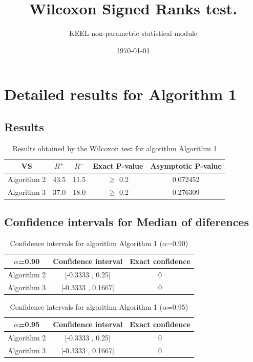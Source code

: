 \documentclass[a4paper,10pt]{article}
\title{Wilcoxon Signed Ranks test.}
\date{\today}
\author{KEEL non-parametric statistical module}
\begin{document}
\pagestyle{empty}
\maketitle
\thispagestyle{empty}



\section{Detailed results for Algorithm 1}


\subsection{Results}

\begin{table}[!htp]
\centering\small
\begin{tabular}{
|c|c|c|c|c|}
\hline
 VS & $R^{+}$ & $R^{-}$ & Exact P-value & Asymptotic P-value \\ \hline 
Algorithm 2 & 43.5 & 11.5 & $\geq$ 0.2 & 0.072452\\ \hline 
Algorithm 3 & 37.0 & 18.0 & $\geq$ 0.2 & 0.276309\\ \hline 

\end{tabular}
\caption{Results obtained by the Wilcoxon test for algorithm Algorithm 1}
\end{table}

\subsection{Confidence intervals for Median of diferences}

\begin{table}[!htp]
\centering\small
\begin{tabular}{
|c|c|c|}
\hline
 $\alpha$=0.90 & Confidence interval & Exact confidence \\ \hline 
Algorithm 2 & [-0.3333 , 0.25] & 0\\ \hline 
Algorithm 3 & [-0.3333 , 0.1667] & 0\\ \hline 

\end{tabular}
\caption{Confidence intervals for algorithm Algorithm 1 ($\alpha$=0.90)}
\end{table}
\begin{table}[!htp]
\centering\small
\begin{tabular}{
|c|c|c|}
\hline
 $\alpha$=0.95 & Confidence interval & Exact confidence \\ \hline 
Algorithm 2 & [-0.3333 , 0.25] & 0\\ \hline 
Algorithm 3 & [-0.3333 , 0.1667] & 0\\ \hline 

\end{tabular}
\caption{Confidence intervals for algorithm Algorithm 1 ($\alpha$=0.95)}
\end{table}
\end{document}
